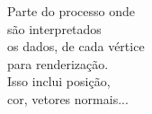 \documentclass[preview]{standalone}
\begin{document}
Parte do processo onde\\são interpretados \\os dados, de cada vértice \\para renderização.\\Isso inclui posição,\\cor, vetores normais...\\
\end{document}
